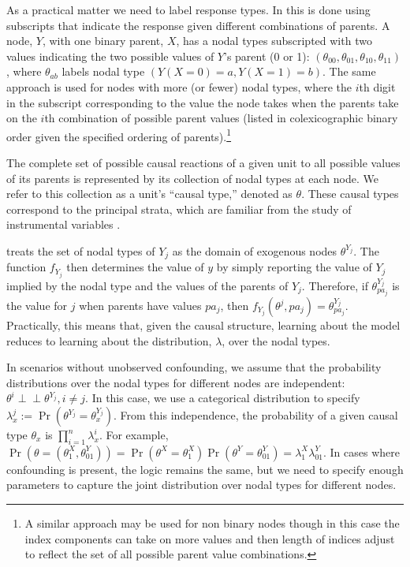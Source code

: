 \documentclass[
  11pt,
  article]{jss}
\begin{document}
As a practical matter we need to label response types. In
 this is done using subscripts that indicate the
response given different combinations of parents. A node, \(Y\), with
one binary parent, \(X\), has a nodal types subscripted with two values
indicating the two possible values of \(Y\)'s parent (0 or 1):
\((\theta_{00}, \theta_{01}, \theta_{10}, \theta_{11})\), where
\(\theta_{ab}\) labels nodal type \((Y(X=0) = a,Y(X=1) = b)\). The same
approach is used for nodes with more (or fewer) nodal types, where the
\(i\)th digit in the subscript corresponding to the value the node takes
when the parents take on the \(i\)th combination of possible parent
values (listed in colexicographic binary order given the specified
ordering of parents).\footnote{A similar approach may be used for non
  binary nodes though in this case the index components can take on more
  values and then length of indices adjust to reflect the set of all
  possible parent value combinations.}

The complete set of possible causal reactions of a given unit to all
possible values of its parents is represented by its collection of nodal
types at each node. We refer to this collection as a unit's ``causal
type,'' denoted as \(\theta\). These causal types correspond to the
principal strata, which are familiar from the study of instrumental
variables \citep{frangakis_principal_2002}.

 treats the set of nodal types of \(Y_j\) as the
domain of exogenous nodes \(\theta^{Y_j}\). The function \(f_{Y_j}\)
then determines the value of \(y\) by simply reporting the value of
\(Y_j\) implied by the nodal type and the values of the parents of
\(Y_j\). Therefore, if \(\theta^{Y_j}_{pa_j}\) is the value for \(j\)
when parents have values \(pa_j\), then
\(f_{Y_j}(\theta^{j}, pa_j) = \theta^{Y_j}_{pa_j}\). Practically, this
means that, given the causal structure, learning about the model reduces
to learning about the distribution, \(\lambda\), over the nodal types.

In scenarios without unobserved confounding, we assume that the
probability distributions over the nodal types for different nodes are
independent: \(\theta^i \perp\!\!\! \perp \theta^{Y_j}, i\neq j\). In
this case, we use a categorical distribution to specify
\({\lambda^j_x} := \Pr(\theta^{Y_j} = {\theta^{Y_j}_x})\). From this
independence, the probability of a given causal type \(\theta_x\) is
\(\prod_{i=1}^n {\lambda^i_x}\). For example,
\(\Pr(\theta = (\theta^X_1, \theta^Y_{01})) = \Pr(\theta^X = \theta^X_1)\Pr(\theta^Y = \theta^Y_{01}) = \lambda^X_1\lambda^Y_{01}\).
In cases where confounding is present, the logic remains the same, but
we need to specify enough parameters to capture the joint distribution
over nodal types for different nodes.
\end{document}
